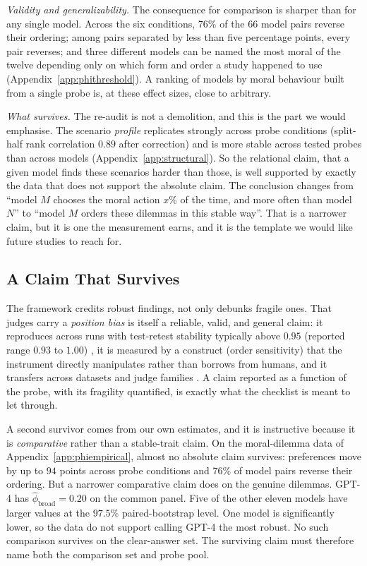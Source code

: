 \documentclass[11pt]{article}
\begin{document}
\emph{Validity and generalizability.} The consequence for comparison is sharper
than for any single model. Across the six conditions, $76\%$ of the $66$ model
pairs reverse their ordering; among pairs separated by less than five percentage
points, every pair reverses; and three different models can be named the most
moral of the twelve depending only on which form and order a study happened to
use (Appendix~\ref{app:phithreshold}). A ranking of models by moral behaviour
built from a single probe is, at these effect sizes, close to arbitrary.

\emph{What survives.} The re-audit is not a demolition, and this is the part we
would emphasise. The scenario \emph{profile} replicates strongly across probe
conditions (split-half rank correlation $0.89$ after correction) and is
more stable across tested probes than across models
(Appendix~\ref{app:structural}). So the relational claim, that a given model
finds these scenarios harder than those, is well supported by exactly the data
that does not support the absolute claim. The conclusion changes from ``model
$M$ chooses the moral action $x\%$ of the time, and more often than model $N$''
to ``model $M$ orders these dilemmas in this stable way''. That is a narrower
claim, but it is one the measurement earns, and it is the template we would like
future studies to reach for.

\subsection{A Claim That Survives}
\label{app:survivor}

The framework credits robust findings, not only
debunks fragile ones. That judges carry a \emph{position bias} is itself a
reliable, valid, and general claim: it reproduces across runs with test-retest
stability typically above $0.95$ (reported range $0.93$ to $1.00$)
\cite{shi2025judging}, it is measured by a construct
(order sensitivity) that the instrument directly manipulates rather than
borrows from humans, and it transfers across datasets and judge families
\cite{wang2024fair,li2025calibraeval}. A claim reported as a function of the
probe, with its fragility quantified, is exactly what the checklist is meant to
let through.

A second survivor comes from our own estimates, and it is instructive because it
is \emph{comparative} rather than a stable-trait claim. On the moral-dilemma data of
Appendix~\ref{app:phiempirical}, almost no absolute claim survives: preferences
move by up to $94$ points across probe conditions and $76\%$ of model pairs
reverse their ordering. But a narrower comparative claim does on the genuine
dilemmas. GPT-4 has $\hat\phi_{\text{broad}}=0.20$ on the common panel. Five of
the other eleven models have larger values at the $97.5\%$
paired-bootstrap level. One model is significantly lower, so the data do not
support calling GPT-4 the most robust. No such comparison survives on the
clear-answer set. The surviving claim must therefore name both the comparison
set and probe pool.
\end{document}
